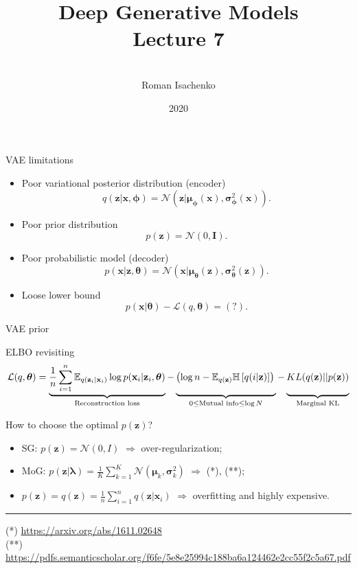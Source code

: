 \documentclass{beamer}
\title[\hbox to 56mm{Deep Generative Models  \hfill\insertframenumber\,/\,\inserttotalframenumber}]
{Deep Generative Models \\ Lecture 7}
\author[Roman Isachenko]{\\Roman Isachenko}
\institute[MIPT]{Moscow Institute of Physics and Technology \\
}
\date{2020}
\newcommand{\bx}{\mathbf{x}}
\newcommand{\bz}{\mathbf{z}}
\newcommand{\bmu}{\boldsymbol{\mu}}
\newcommand{\blambda}{\boldsymbol{\lambda}}
\newcommand{\bsigma}{\boldsymbol{\sigma}}
\newcommand{\btheta}{\boldsymbol{\theta}}
\newcommand{\bphi}{\boldsymbol{\phi}}
\begin{document}
\begin{frame}
\titlepage
\end{frame}
\begin{frame}{VAE limitations}
	\begin{itemize}
		\item Poor variational posterior distribution (encoder)
		\[
		q(\bz | \bx, \bphi) = \mathcal{N}(\bz| \bmu_{\bphi}(\bx), \bsigma^2_{\bphi}(\bx)).
		\]
		\item Poor prior distribution
		\[
		p(\bz) = \mathcal{N}(0, \mathbf{I}).
		\]
		\item Poor probabilistic model (decoder)
		\[
		p(\bx | \bz, \btheta) = \mathcal{N}(\bx| \bmu_{\btheta}(\bz), \bsigma^2_{\btheta}(\bz)).
		\]
		\item Loose lower bound
		\[
		p(\bx | \btheta) - \mathcal{L}(q, \btheta) = (?).
		\]
	\end{itemize}
\end{frame}
\begin{frame}{VAE prior}
	\begin{block}{ELBO revisiting}
		\vspace{-0.3cm}
		{\footnotesize
			\[
			\mathcal{L}(q, \btheta) = \underbrace{\frac{1}{n} \sum_{i=1}^n \mathbb{E}_{q(\bz_i | \bx_i)} \log p(\bx_i | \bz_i, \btheta)}_{\text{Reconstruction loss}} - \underbrace{\left(\log n - \mathbb{E}_{q(\bz)} \mathbb{H} \left[ q(i | \bz) \right] \right)\vphantom{\sum_{i=1}}}_{0 \leq \text{Mutual info} \leq \log N } - \underbrace{KL(q(\bz) || p(\bz))\vphantom{\sum_{i=1}}}_{\text{Marginal KL}}
			\]}
	\end{block}
	
	How to choose the optimal $p(\bz)$?
	\begin{itemize}
		\item SG: $p(\bz) = \mathcal{N}(0, I)$ $\Rightarrow$ over-regularization;
		\vspace{0.1cm}
		\item MoG: $p(\bz | \blambda) = \frac{1}{K} \sum_{k=1}^K \mathcal{N}(\bmu_k, \bsigma_k^2)$ $\Rightarrow$ (*), (**);
		\vspace{0.1cm}
		\item $p(\bz) = q(\bz) = \frac{1}{n}\sum_{i=1}^n q(\bz | \bx_i)$ $\Rightarrow$ overfitting and highly expensive.
	\end{itemize}
	\vfill
	\hrule\medskip
	{\tiny 
		(*) \href{https://arxiv.org/abs/1611.02648}{https://arxiv.org/abs/1611.02648} \\
		(**) \href{https://pdfs.semanticscholar.org/f6fe/5e8e25994c188ba6a124462e2cc55f2c5a67.pdf}{https://pdfs.semanticscholar.org/f6fe/5e8e25994c188ba6a124462e2cc55f2c5a67.pdf}}
	
\end{frame}
\end{document}

